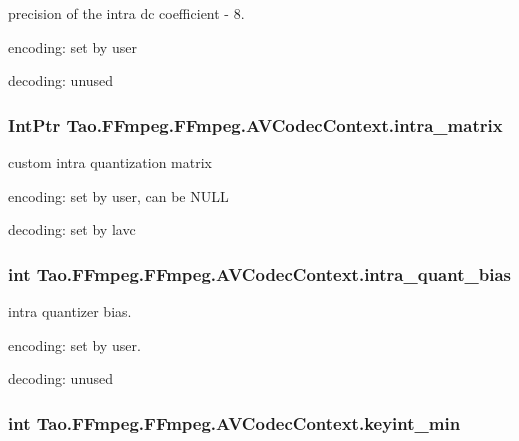 \label{struct_tao_1_1_f_fmpeg_1_1_f_fmpeg_1_1_a_v_codec_context_aac12774efc670bf0d1983e8858ac0fc3}
precision of the intra dc coefficient -\/ 8.
\begin{DoxyItemize}
\item encoding: set by user
\item decoding: unused 
\end{DoxyItemize}\hypertarget{struct_tao_1_1_f_fmpeg_1_1_f_fmpeg_1_1_a_v_codec_context_a0b1350b86db03a075a90c15f524fe245}{
\subsubsection[{intra\_\-matrix}]{\setlength{\rightskip}{0pt plus 5cm}IntPtr {\bf Tao.FFmpeg.FFmpeg.AVCodecContext.intra\_\-matrix}}}
\label{struct_tao_1_1_f_fmpeg_1_1_f_fmpeg_1_1_a_v_codec_context_a0b1350b86db03a075a90c15f524fe245}
custom intra quantization matrix
\begin{DoxyItemize}
\item encoding: set by user, can be NULL
\item decoding: set by lavc 
\end{DoxyItemize}\hypertarget{struct_tao_1_1_f_fmpeg_1_1_f_fmpeg_1_1_a_v_codec_context_a41d8ee1cf17a655160bcbaf87b7d046b}{
\subsubsection[{intra\_\-quant\_\-bias}]{\setlength{\rightskip}{0pt plus 5cm}int {\bf Tao.FFmpeg.FFmpeg.AVCodecContext.intra\_\-quant\_\-bias}}}
\label{struct_tao_1_1_f_fmpeg_1_1_f_fmpeg_1_1_a_v_codec_context_a41d8ee1cf17a655160bcbaf87b7d046b}
intra quantizer bias.
\begin{DoxyItemize}
\item encoding: set by user.
\item decoding: unused 
\end{DoxyItemize}\hypertarget{struct_tao_1_1_f_fmpeg_1_1_f_fmpeg_1_1_a_v_codec_context_a2532421bd1bed4aa71df89d5ac3c5bd2}{
\subsubsection[{keyint\_\-min}]{\setlength{\rightskip}{0pt plus 5cm}int {\bf Tao.FFmpeg.FFmpeg.AVCodecContext.keyint\_\-min}}}
